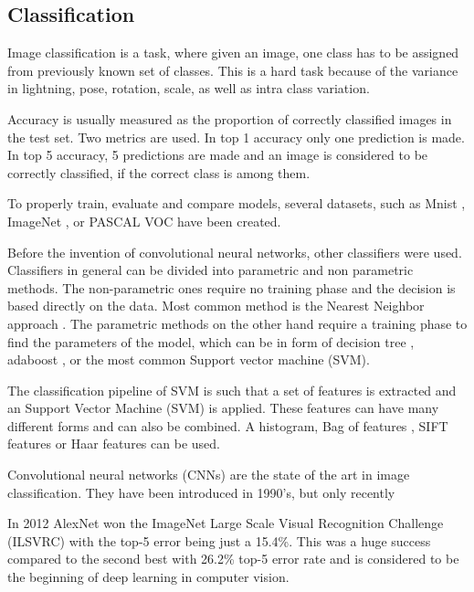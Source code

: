 \documentclass[a4paper,12pt,titlepage]{article}
\numberwithin{figure}{section}
\begin{document}
\subsection{Classification}

Image classification is a task, where given an image, one class has to be assigned from previously known set of classes. This is a hard task because of the variance in lightning, pose, rotation, scale, as well as intra class variation.  

Accuracy is usually measured as the proportion of correctly classified images in the test set. Two metrics are used. In top 1 accuracy only one prediction is made. In top 5 accuracy, 5 predictions are made and an image is considered to be correctly classified, if the correct class is among them.

To properly train, evaluate and compare models, several datasets, such as Mnist \cite{lecun-mnisthandwrittendigit-2010}, ImageNet \cite{deng2009imagenet}, or PASCAL VOC \cite{Everingham10} have been created.

Before the invention of convolutional neural networks, other classifiers were used. Classifiers in general can be divided into parametric and non parametric methods. The non-parametric ones require no training phase and the decision is based directly on the data. Most common method is the Nearest Neighbor approach \cite{boiman2008defense, zhang2006svm}. The parametric methods on the other hand require a training phase to find the parameters of the model, which can be in form of decision tree \cite{bosch2007image}, adaboost \cite{opelt2004weak}, or the most common Support vector machine (SVM).

The classification pipeline of SVM is such that a set of features is extracted and an Support Vector Machine (SVM) is applied. These features can have many different forms and can also be combined. A histogram\cite{chapelle1999support}, Bag of features \cite{lazebnik2006beyond, nowak2006sampling}, SIFT features \cite{yang2009linear, bicego2006use} or Haar features \cite{munder2006experimental} can be used.

Convolutional neural networks (CNNs) are the state of the art in image classification. They have been introduced in 1990's\cite{lecun1989backpropagation}, but only recently 

In 2012 AlexNet \cite{krizhevsky2012imagenet} won the ImageNet Large Scale Visual Recognition Challenge (ILSVRC) with the top-5 error being just a 15.4\%. This was a huge success compared to the second best with 26.2\% top-5 error rate and is considered to be the beginning of deep learning in computer vision. 
\end{document}
